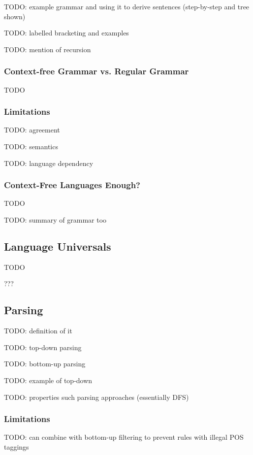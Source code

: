 \documentclass{article}
\begin{document}
TODO: example grammar and using it to derive sentences (step-by-step and tree shown)

TODO: labelled bracketing and examples

TODO: mention of recursion

\subsubsection{Context-free Grammar vs. Regular Grammar}

TODO

\subsubsection{Limitations}

TODO: agreement

TODO: semantics

TODO: language dependency

\subsubsection{Context-Free Languages Enough?}

TODO

TODO: summary of grammar too

\subsection{Language Universals}

TODO

???

\subsection{Parsing}

TODO: definition of it

TODO: top-down parsing

TODO: bottom-up parsing

TODO: example of top-down

TODO: properties such parsing approaches (essentially DFS)

\subsubsection{Limitations}

TODO: can combine with bottom-up filtering to prevent rules with illegal POS taggings
\end{document}
